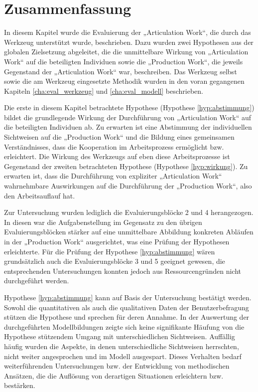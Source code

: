 
\section{Zusammenfassung} %
\label{sec:a_zusammenfassung}

In diesem Kapitel wurde die Evaluierung der „Articulation Work“, die durch das Werkzeug unterstützt wurde, beschrieben. Dazu wurden zwei Hypothesen aus der globalen Zielsetzung abgeleitet, die die unmittelbare Wirkung von „Articulation Work“ auf die beteiligten Individuen sowie die „Production Work“, die jeweils Gegenstand der „Articulation Work“ war, beschreiben. Das Werkzeug selbst sowie die am Werkzeug eingesetzte Methodik wurden in den voran gegangenen Kapiteln \ref{cha:eval_werkzeug} und \ref{cha:eval_modell} beschrieben.

Die erste in diesem Kapitel betrachtete Hypothese (Hypothese \ref{hyp:abstimmung}) bildet die grundlegende Wirkung der Durchführung von „Articulation Work“ auf die beteiligten Individuen ab. Zu erwarten ist eine Abstimmung der individuellen Sichtweisen auf die „Production Work“ und die Bildung eines gemeinsamen Verständnisses, dass die Kooperation im Arbeitsprozess ermöglicht bzw. erleichtert. Die Wirkung des Werkzeugs auf eben diese Arbeitsprozesse ist Gegenstand der zweiten betrachteten Hypothese (Hypothese \ref{hyp:wirkung}). Zu erwarten ist, dass die Durchführung von expliziter „Articulation Work“ wahrnehmbare Auswirkungen auf die Durchführung der „Production Work“, also den Arbeitsauflauf hat.

Zur Untersuchung wurden lediglich die Evaluierungsblöcke 2 und 4 herangezogen. In diesen war die Aufgabenstellung im Gegensatz zu den übrigen Evaluierungsblöcken stärker auf eine unmittelbare Abbildung konkreten Abläufen in der „Production Work“ ausgerichtet, was eine Prüfung der Hypothesen erleichterte. Für die Prüfung der Hypothese \ref{hyp:abstimmung} wären grundsätzlich auch die Evaluierungsblöcke 3 und 5 geeignet gewesen, die entsprechenden Untersuchungen konnten jedoch aus Ressourcengründen nicht durchgeführt werden.

Hypothese \ref{hyp:abstimmung} kann auf Basis der Untersuchung bestätigt werden. Sowohl die quantitativen als auch die qualitativen Daten der Benutzerbefragung stützen die Hypothese und sprechen für deren Annahme. In der Auswertung der durchgeführten Modellbildungen zeigte sich keine signifikante Häufung von die Hypothese stützendem Umgang mit unterschiedlichen Sichtweisen. Auffällig häufig wurden die Aspekte, in denen unterschiedliche Sichtweisen herrschten, nicht weiter angesprochen und im Modell ausgespart. Dieses Verhalten bedarf weiterführenden Untersuchungen bzw. der Entwicklung von methodischen Ansätzen, die die Auflösung von derartigen Situationen erleichtern bzw. bestärken.


